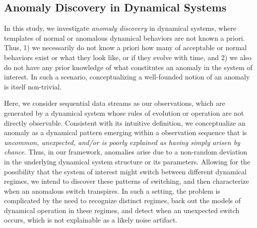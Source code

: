 \documentclass[9pt,journal,compsoc]{IEEEtran}
\begin{document}
{\subsection{Anomaly Discovery in Dynamical Systems}
  In this study,  we investigate \textit{anomaly discovery} in dynamical systems, where  templates of normal or anomalous dynamical behaviors are not known a priori. Thus, 1) we necessarily do not know a priori  how many of acceptable or normal behaviors exist or what they look like, or if they evolve with time, and 2) we also do not have any prior knowledge of what constitutes an anomaly  in the system of interest. In such a scenario, conceptualizing a well-founded notion of an anomaly is itself non-trivial.

  Here, we consider sequential data streams as our observations, which are generated by a  dynamical system whose rules of evolution or operation are not directly observable. Consistent with its intuitive definition, we conceptualize an anomaly as a dynamical pattern emerging within   a observation sequence that is \textit{uncommon, unexpected, and/or is poorly explained as having simply arisen by chance}.
  Thus, in our framework, anomalies  arise due to a non-random  deviation in the   underlying dynamical system structure or its parameters. Allowing for the possibility that the system of interest might switch between different dynamical regimes, we intend to discover these patterns of switching, and then characterize when an anomalous switch transpires. In such a setting, the problem is  complicated by the need to recognize distinct regimes,  back out the models of dynamical operation in these regimes, and detect when an unexpected switch occurs, which is not explainable as a likely noise artifact.

}
\end{document}

